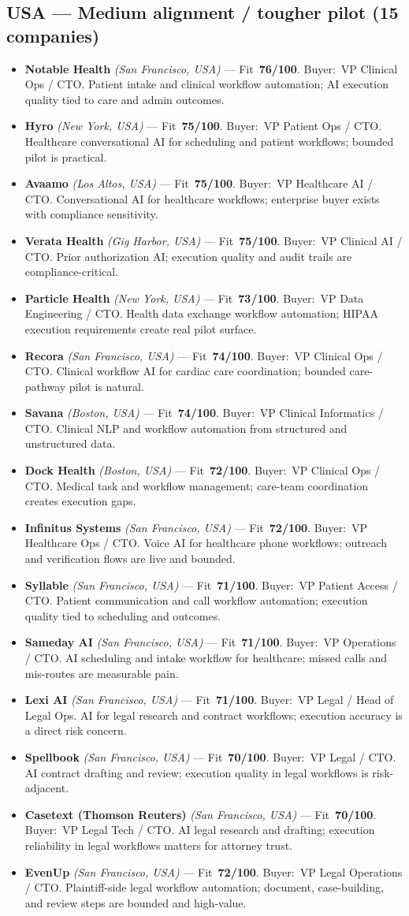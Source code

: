 \documentclass[10pt]{article}
\newcommand{\cand}[5]{\item \textbf{#1} \textit{(#2)} --- Fit~\textbf{#3/100}. Buyer:~#4. #5}
\begin{document}
\subsection{USA --- Medium alignment / tougher pilot (15 companies)}
\begin{itemize}
\cand{Notable Health}{San Francisco, USA}{76}{VP Clinical Ops / CTO}{Patient intake and clinical workflow automation; AI execution quality tied to care and admin outcomes.}
\cand{Hyro}{New York, USA}{75}{VP Patient Ops / CTO}{Healthcare conversational AI for scheduling and patient workflows; bounded pilot is practical.}
\cand{Avaamo}{Los Altos, USA}{75}{VP Healthcare AI / CTO}{Conversational AI for healthcare workflows; enterprise buyer exists with compliance sensitivity.}
\cand{Verata Health}{Gig Harbor, USA}{75}{VP Clinical AI / CTO}{Prior authorization AI; execution quality and audit trails are compliance-critical.}
\cand{Particle Health}{New York, USA}{73}{VP Data Engineering / CTO}{Health data exchange workflow automation; HIPAA execution requirements create real pilot surface.}
\cand{Recora}{San Francisco, USA}{74}{VP Clinical Ops / CTO}{Clinical workflow AI for cardiac care coordination; bounded care-pathway pilot is natural.}
\cand{Savana}{Boston, USA}{74}{VP Clinical Informatics / CTO}{Clinical NLP and workflow automation from structured and unstructured data.}
\cand{Dock Health}{Boston, USA}{72}{VP Clinical Ops / CTO}{Medical task and workflow management; care-team coordination creates execution gaps.}
\cand{Infinitus Systems}{San Francisco, USA}{72}{VP Healthcare Ops / CTO}{Voice AI for healthcare phone workflows; outreach and verification flows are live and bounded.}
\cand{Syllable}{San Francisco, USA}{71}{VP Patient Access / CTO}{Patient communication and call workflow automation; execution quality tied to scheduling and outcomes.}
\cand{Sameday AI}{San Francisco, USA}{71}{VP Operations / CTO}{AI scheduling and intake workflow for healthcare; missed calls and mis-routes are measurable pain.}
\cand{Lexi AI}{San Francisco, USA}{71}{VP Legal / Head of Legal Ops}{AI for legal research and contract workflows; execution accuracy is a direct risk concern.}
\cand{Spellbook}{San Francisco, USA}{70}{VP Legal / CTO}{AI contract drafting and review; execution quality in legal workflows is risk-adjacent.}
\cand{Casetext (Thomson Reuters)}{San Francisco, USA}{70}{VP Legal Tech / CTO}{AI legal research and drafting; execution reliability in legal workflows matters for attorney trust.}
\cand{EvenUp}{San Francisco, USA}{72}{VP Legal Operations / CTO}{Plaintiff-side legal workflow automation; document, case-building, and review steps are bounded and high-value.}
\end{itemize}
\clearpage
\end{document}
